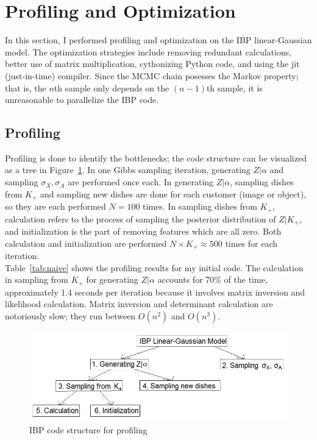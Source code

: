 \section{Profiling and Optimization}
In this section, I performed profiling and optimization on the IBP linear-Gaussian model. The optimization strategies include removing redundant calculations, better use of matrix multiplication, cythonizing Python code, and using the jit (just-in-time) compiler. Since the MCMC chain posesses the Markov property; that is, the $n$th sample only depends on the $(n-1)$th sample, it is unreasonable to parallelize the IBP code.

\subsection{Profiling}
Profiling is done to identify the bottlenecks; the code structure can be visualized as a tree in Figure~\ref{fig:profiling}. In one Gibbs sampling iteration, generating $Z|\alpha$ and sampling $\sigma_X,\sigma_A$ are performed once each. In generating $Z|\alpha$, sampling dishes from $K_+$ and sampling new dishes are done for each customer (image or object), so they are each performed $N=100$ times. In sampling dishes from $K_+$, calculation refers to the process of sampling the posterior distribution of $Z|K_+$, and initialization is the part of removing features which are all zero. Both calculation and initialization are performed $N\times K_+ \approx 500$ times for each iteration.\\

Table~\ref{tab:naive} shows the profiling results for my initial code. The calculation in sampling from $K_+$ for generating $Z|\alpha$ accounts for 70\% of the time, approximately 1.4 seconds per iteration because it involves matrix inversion and likelihood calculation. Matrix inversion and determinant calculation are notoriously slow; they run between $O(n^2)$ and $O(n^3)$.

\begin{figure}[!ht]
\centering
    \includegraphics[width=\linewidth]{More_Images/IBP_profiling.png}
    \caption{IBP code structure for profiling}
    \label{fig:profiling}
\end{figure}

